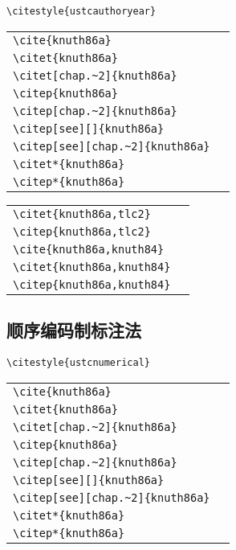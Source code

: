 \noindent
\verb|\citestyle{ustcauthoryear}|

\noindent
\begin{tabular}{l@{\quad$\Rightarrow$\quad}l}
  \verb|\cite{knuth86a}| & \cite{knuth86a}\\
  \verb|\citet{knuth86a}| & \citet{knuth86a}\\
  \verb|\citet[chap.~2]{knuth86a}| & \citet[chap.~2]{knuth86a}\\[0.5ex]
  \verb|\citep{knuth86a}| & \citep{knuth86a}\\
  \verb|\citep[chap.~2]{knuth86a}| & \citep[chap.~2]{knuth86a}\\
  \verb|\citep[see][]{knuth86a}| & \citep[see][]{knuth86a}\\
  \verb|\citep[see][chap.~2]{knuth86a}| & \citep[see][chap.~2]{knuth86a}\\[0.5ex]
  \verb|\citet*{knuth86a}| & \citet*{knuth86a}\\
  \verb|\citep*{knuth86a}| & \citep*{knuth86a}\\
\end{tabular}

\noindent
\begin{tabular}{l@{\quad$\Rightarrow$\quad}l}
  \verb|\citet{knuth86a,tlc2}| & \citet{knuth86a,tlc2}\\
  \verb|\citep{knuth86a,tlc2}| & \citep{knuth86a,tlc2}\\
  \verb|\cite{knuth86a,knuth84}| & \cite{knuth86a,knuth84}\\
  \verb|\citet{knuth86a,knuth84}| & \citet{knuth86a,knuth84}\\
  \verb|\citep{knuth86a,knuth84}| & \citep{knuth86a,knuth84}\\
\end{tabular}

\subsection{顺序编码制标注法}

\noindent
\verb|\citestyle{ustcnumerical}|

\noindent
\begin{tabular}{l@{\quad$\Rightarrow$\quad}l}
  \verb|\cite{knuth86a}| & \cite{knuth86a}\\
  \verb|\citet{knuth86a}| & \citet{knuth86a}\\
  \verb|\citet[chap.~2]{knuth86a}| & \citet[chap.~2]{knuth86a}\\[0.5ex]
  \verb|\citep{knuth86a}| & \citep{knuth86a}\\
  \verb|\citep[chap.~2]{knuth86a}| & \citep[chap.~2]{knuth86a}\\
  \verb|\citep[see][]{knuth86a}| & \citep[see][]{knuth86a}\\
  \verb|\citep[see][chap.~2]{knuth86a}| & \citep[see][chap.~2]{knuth86a}\\[0.5ex]
  \verb|\citet*{knuth86a}| & \citet*{knuth86a}\\
  \verb|\citep*{knuth86a}| & \citep*{knuth86a}\\
\end{tabular}

